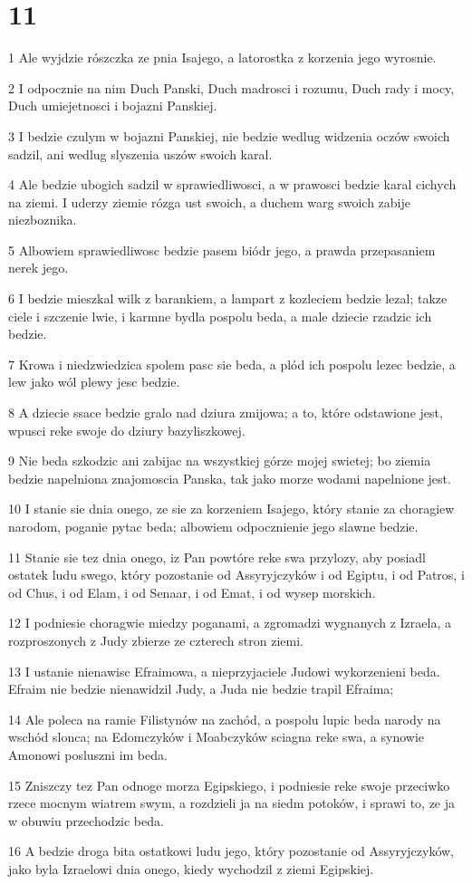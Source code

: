 \chapter{11}

\par 1 Ale wyjdzie rószczka ze pnia Isajego, a latorostka z korzenia jego wyrosnie.
\par 2 I odpocznie na nim Duch Panski, Duch madrosci i rozumu, Duch rady i mocy, Duch umiejetnosci i bojazni Panskiej.
\par 3 I bedzie czulym w bojazni Panskiej, nie bedzie wedlug widzenia oczów swoich sadzil, ani wedlug slyszenia uszów swoich karal.
\par 4 Ale bedzie ubogich sadzil w sprawiedliwosci, a w prawosci bedzie karal cichych na ziemi. I uderzy ziemie rózga ust swoich, a duchem warg swoich zabije niezboznika.
\par 5 Albowiem sprawiedliwosc bedzie pasem biódr jego, a prawda przepasaniem nerek jego.
\par 6 I bedzie mieszkal wilk z barankiem, a lampart z kozleciem bedzie lezal; takze ciele i szczenie lwie, i karmne bydla pospolu beda, a male dziecie rzadzic ich bedzie.
\par 7 Krowa i niedzwiedzica spolem pasc sie beda, a plód ich pospolu lezec bedzie, a lew jako wól plewy jesc bedzie.
\par 8 A dziecie ssace bedzie gralo nad dziura zmijowa; a to, które odstawione jest, wpusci reke swoje do dziury bazyliszkowej.
\par 9 Nie beda szkodzic ani zabijac na wszystkiej górze mojej swietej; bo ziemia bedzie napelniona znajomoscia Panska, tak jako morze wodami napelnione jest.
\par 10 I stanie sie dnia onego, ze sie za korzeniem Isajego, który stanie za choragiew narodom, poganie pytac beda; albowiem odpocznienie jego slawne bedzie.
\par 11 Stanie sie tez dnia onego, iz Pan powtóre reke swa przylozy, aby posiadl ostatek ludu swego, który pozostanie od Assyryjczyków i od Egiptu, i od Patros, i od Chus, i od Elam, i od Senaar, i od Emat, i od wysep morskich.
\par 12 I podniesie choragwie miedzy poganami, a zgromadzi wygnanych z Izraela, a rozproszonych z Judy zbierze ze czterech stron ziemi.
\par 13 I ustanie nienawisc Efraimowa, a nieprzyjaciele Judowi wykorzenieni beda. Efraim nie bedzie nienawidzil Judy, a Juda nie bedzie trapil Efraima;
\par 14 Ale poleca na ramie Filistynów na zachód, a pospolu lupic beda narody na wschód slonca; na Edomczyków i Moabczyków sciagna reke swa, a synowie Amonowi posluszni im beda.
\par 15 Zniszczy tez Pan odnoge morza Egipskiego, i podniesie reke swoje przeciwko rzece mocnym wiatrem swym, a rozdzieli ja na siedm potoków, i sprawi to, ze ja w obuwiu przechodzic beda.
\par 16 A bedzie droga bita ostatkowi ludu jego, który pozostanie od Assyryjczyków, jako byla Izraelowi dnia onego, kiedy wychodzil z ziemi Egipskiej.

